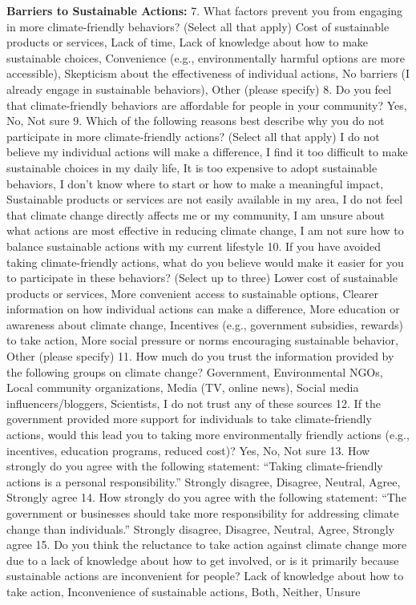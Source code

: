 \documentclass[
  letterpaper,
  DIV=11,
  numbers=noendperiod]{scrartcl}
\begin{document}
\textbf{Barriers to Sustainable Actions: } 7. What factors prevent you
from engaging in more climate-friendly behaviors? (Select all that
apply) Cost of sustainable products or services, Lack of time, Lack of
knowledge about how to make sustainable choices, Convenience (e.g.,
environmentally harmful options are more accessible), Skepticism about
the effectiveness of individual actions, No barriers (I already engage
in sustainable behaviors), Other (please specify) 8. Do you feel that
climate-friendly behaviors are affordable for people in your community?
Yes, No, Not sure 9. Which of the following reasons best describe why
you do not participate in more climate-friendly actions? (Select all
that apply) I do not believe my individual actions will make a
difference, I find it too difficult to make sustainable choices in my
daily life, It is too expensive to adopt sustainable behaviors, I don't
know where to start or how to make a meaningful impact, Sustainable
products or services are not easily available in my area, I do not feel
that climate change directly affects me or my community, I am unsure
about what actions are most effective in reducing climate change, I am
not sure how to balance sustainable actions with my current lifestyle
10. If you have avoided taking climate-friendly actions, what do you
believe would make it easier for you to participate in these behaviors?
(Select up to three) Lower cost of sustainable products or services,
More convenient access to sustainable options, Clearer information on
how individual actions can make a difference, More education or
awareness about climate change, Incentives (e.g., government subsidies,
rewards) to take action, More social pressure or norms encouraging
sustainable behavior, Other (please specify) 11. How much do you trust
the information provided by the following groups on climate change?
Government, Environmental NGOs, Local community organizations, Media
(TV, online news), Social media influencers/bloggers, Scientists, I do
not trust any of these sources 12. If the government provided more
support for individuals to take climate-friendly actions, would this
lead you to taking more environmentally friendly actions (e.g.,
incentives, education programs, reduced cost)? Yes, No, Not sure 13. How
strongly do you agree with the following statement: ``Taking
climate-friendly actions is a personal responsibility.'' Strongly
disagree, Disagree, Neutral, Agree, Strongly agree 14. How strongly do
you agree with the following statement: ``The government or businesses
should take more responsibility for addressing climate change than
individuals.'' Strongly disagree, Disagree, Neutral, Agree, Strongly
agree 15. Do you think the reluctance to take action against climate
change more due to a lack of knowledge about how to get involved, or is
it primarily because sustainable actions are inconvenient for people?
Lack of knowledge about how to take action, Inconvenience of sustainable
actions, Both, Neither, Unsure
\end{document}
